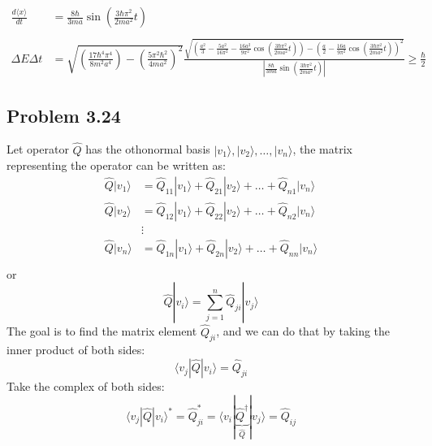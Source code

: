 \documentclass{article}
\begin{document}
\begin{align*}
	\frac{d \langle x \rangle }{dt} & = \frac{8 \hbar}{3ma} \sin \left(\frac{3 \hbar \pi^2 }{2 m a ^2 } t\right)                                                                                                                                                                                                                                                                                                                                                                                                    \\ \\
	\Delta E \Delta t               & = \sqrt{\left( \frac{17 \hbar^4 \pi^4}{8 m^2 a^4 } \right) - \left(\frac{5 \pi^2 \hbar^2}{4ma^2}\right)^2} \frac{\sqrt{\left(\frac{a^2}{3} - \frac{5a^2}{16 \pi^2} - \frac{16a^2}{9 \pi^2} \cos \left(\frac{3 \hbar \pi^2 }{2 m a ^2 } t\right)\right) - \left(\frac{a}{2} - \frac{16a}{9 \pi^2 } \cos\left(\frac{3 \hbar \pi^2 }{2 m a ^2 } t\right)  \right)^2}}{\left|\frac{8 \hbar}{3ma} \sin \left(\frac{3 \hbar \pi^2 }{2 m a ^2 } t\right)\right|} \ge \frac{\hbar}{2}
\end{align*}

\subsection*{Problem 3.24}

Let operator \(\hat{Q}\) has the othonormal basis \( |v_1 \rangle, |v_2 \rangle, \dots , |v_n \rangle\), the matrix representing the operator can be written as:
\begin{align*}
	\hat{Q} |v_1 \rangle & = \hat{Q}_{11} |v_1 \rangle + \hat{Q}_{21} |v_2 \rangle + \dots + \hat{Q}_{n1} |v_n \rangle \\
	\hat{Q} |v_2 \rangle & = \hat{Q}_{12} |v_1 \rangle + \hat{Q}_{22} |v_2 \rangle + \dots + \hat{Q}_{n2} |v_n \rangle \\
	                     & \vdots                                                                                      \\
	\hat{Q} |v_n \rangle & = \hat{Q}_{1n} |v_1 \rangle + \hat{Q}_{2n} |v_2 \rangle + \dots + \hat{Q}_{nn} |v_n \rangle \\
\end{align*}
or
\begin{equation*}
	\hat{Q}|v_i \rangle = \sum_{j=1}^{n} \hat{Q}_{ji} |v_j \rangle
\end{equation*}
The goal is to find the matrix element \(\hat{Q}_{ji}\), and we can do that by taking the inner product of both sides:
\begin{equation*}
	\langle v_j | \hat{Q} | v_i \rangle = \hat{Q}_{ji}
\end{equation*}
Take the complex of both sides:
\begin{equation*}
	\langle v_j | \hat{Q} | v_i \rangle^* = \hat{Q}_{ji}^* = \langle v_i | \underbrace{\hat{Q}^\dagger}_{\hat{Q}} | v_j \rangle  = \hat{Q}_{ij}
\end{equation*}
\end{document}
